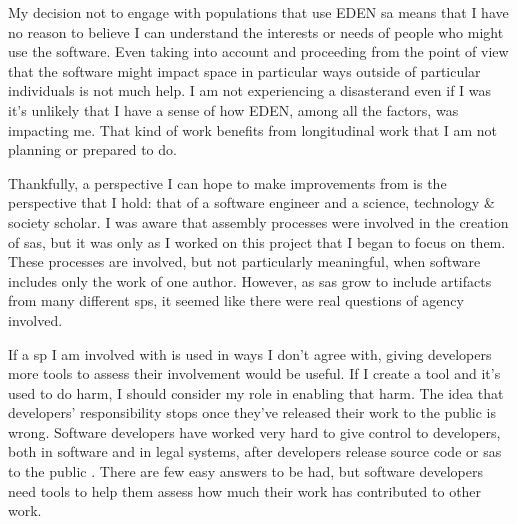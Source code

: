 \documentclass[a4paper,man,natbib,floatsintext]{apa6}
\begin{document}
  My decision not to engage with populations that use \gls{EDEN} \gls{sa} means that I have no reason to believe I can understand the interests or needs of people who might use the software. Even taking \citet{Kitchin2011-af} into account and proceeding from the point of view that the software might impact space in particular ways outside of particular individuals is not much help. I am not experiencing a disaster\footnotemark and even if I was it's unlikely that I have a sense of how \gls{EDEN}, among all the factors, was impacting me. That kind of work benefits from longitudinal work that I am not planning or prepared to do.


  Thankfully, a perspective I can hope to make improvements from is the perspective that I hold: that of a software engineer and a science, technology \& society scholar. I was aware that assembly processes were involved in the creation of \glspl{sa}, but it was only as I worked on this project that I began to focus on them. These processes are involved, but not particularly meaningful, when software includes only the work of one author\footnotemark. However, as \glspl{sa} grow to include artifacts from many different \glspl{sp}, it seemed like there were real questions of agency involved. 


  If a \gls{sp} I am involved with is used in ways I don't agree with, giving developers more tools to assess their involvement would be useful. If I create a tool and it's used to do harm, I should consider my role in enabling that harm. The idea that developers' responsibility stops once they've released their work to the public is wrong. Software developers have worked very hard to give control to developers, both in software and in legal systems, after developers release source code or \glspl{sa} to the public \citep{Gabriella_Coleman2012-lq,Kelty2008-jm}. There are few easy answers to be had, but software developers need tools to help them assess how much their work has contributed to other work. 
\end{document}
